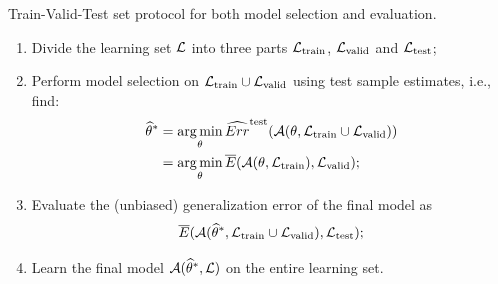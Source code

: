 \begin{algorithm}\label{algo:train-valid-test}
Train-Valid-Test set protocol for both model selection and evaluation.

\begin{enumerate}
\item Divide the learning set ${\cal L}$ into three parts
      ${\cal L}_\text{train}$, ${\cal L}_\text{valid}$ and ${\cal L}_\text{test}$;
\item Perform model selection on ${\cal L}_\text{train} \cup {\cal L}_\text{valid}$
      using test sample estimates, i.e., find:
      \begin{align}
      \widehat{\theta}^* &= \operatorname*{arg\,min}_{\theta} \widehat{Err}^\text{test}({\cal A}(\theta, {\cal L}_\text{train} \cup {\cal L}_\text{valid})) \\
                         &= \operatorname*{arg\,min}_{\theta} \overline{E}({\cal A}(\theta, {\cal L}_\text{train}), {\cal L}_\text{valid});
      \end{align}
\item Evaluate the (unbiased) generalization error of the final model as
      \begin{equation}
      \overline{E}({\cal A}(\widehat{\theta}^*, {\cal L}_\text{train} \cup {\cal L}_\text{valid}), {\cal L}_\text{test});
      \end{equation}
\item Learn the final model ${\cal A}(\widehat{\theta}^*, {\cal L})$ on the entire learning set.
\end{enumerate}
\end{algorithm}

